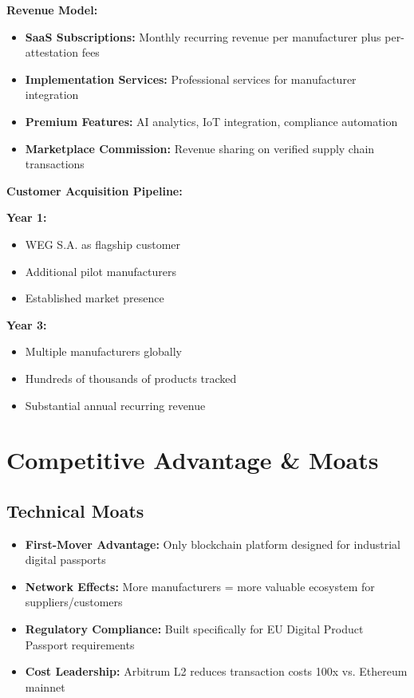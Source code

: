 \documentclass[11pt,a4paper]{article}
\begin{document}
\textbf{Revenue Model:}
\begin{itemize}[leftmargin=0.5cm]
    \item \textbf{SaaS Subscriptions:} Monthly recurring revenue per manufacturer plus per-attestation fees
    \item \textbf{Implementation Services:} Professional services for manufacturer integration
    \item \textbf{Premium Features:} AI analytics, IoT integration, compliance automation
    \item \textbf{Marketplace Commission:} Revenue sharing on verified supply chain transactions
\end{itemize}

\textbf{Customer Acquisition Pipeline:}
\begin{multicols}{2}
\textbf{Year 1:}
\begin{itemize}[leftmargin=0.3cm]
    \item WEG S.A. as flagship customer
    \item Additional pilot manufacturers
    \item Established market presence
\end{itemize}

\textbf{Year 3:}
\begin{itemize}[leftmargin=0.3cm]
    \item Multiple manufacturers globally
    \item Hundreds of thousands of products tracked
    \item Substantial annual recurring revenue
\end{itemize}
\end{multicols}

\section{Competitive Advantage \& Moats}

\subsection{Technical Moats}
\begin{itemize}[leftmargin=0.5cm]
    \item \textbf{First-Mover Advantage:} Only blockchain platform designed for industrial digital passports
    \item \textbf{Network Effects:} More manufacturers = more valuable ecosystem for suppliers/customers
    \item \textbf{Regulatory Compliance:} Built specifically for EU Digital Product Passport requirements
    \item \textbf{Cost Leadership:} Arbitrum L2 reduces transaction costs 100x vs. Ethereum mainnet
\end{itemize}
\end{document}
